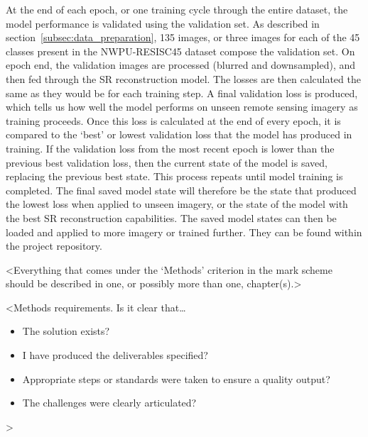At the end of each epoch, or one training cycle through the entire dataset, the model performance is validated using the validation set. As described in section~\ref{subsec:data_preparation}, 135 images, or three images for each of the 45 classes present in the NWPU-RESISC45 dataset compose the validation set. On epoch end, the validation images are processed (blurred and downsampled), and then fed through the SR reconstruction model. The losses are then calculated the same as they would be for each training step. A final validation loss is produced, which tells us how well the model performs on unseen remote sensing imagery as training proceeds. Once this loss is calculated at the end of every epoch, it is compared to the `best' or lowest validation loss that the model has produced in training. If the validation loss from the most recent epoch is lower than the previous best validation loss, then the current state of the model is saved, replacing the previous best state. This process repeats until model training is completed. The final saved model state will therefore be the state that produced the lowest loss when applied to unseen imagery, or the state of the model with the best SR reconstruction capabilities. The saved model states can then be loaded and applied to more imagery or trained further. They can be found within the project repository.


<Everything that comes under the `Methods' criterion in the mark scheme should be described in one, or possibly more than one, chapter(s).>

<Methods requirements. Is it clear that\dots
\begin{itemize}
    \item The solution exists?
    \item I have produced the deliverables specified?
    \item Appropriate steps or standards were taken to ensure a quality output?
    \item The challenges were clearly articulated?
\end{itemize}
>
